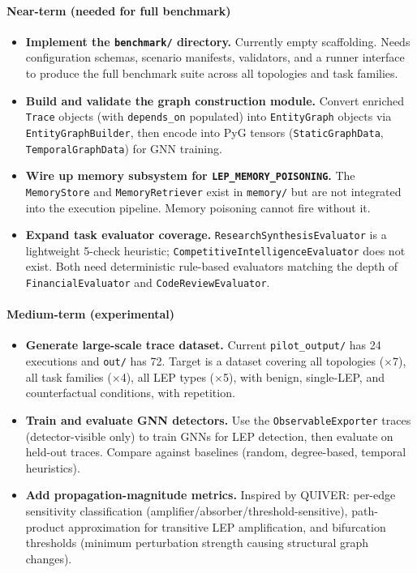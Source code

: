 \paragraph{Near-term (needed for full benchmark)}
\begin{itemize}
    \item \textbf{Implement the \texttt{benchmark/} directory.} Currently empty scaffolding. Needs configuration schemas, scenario manifests, validators, and a runner interface to produce the full benchmark suite across all topologies and task families.
    \item \textbf{Build and validate the graph construction module.} Convert enriched \texttt{Trace} objects (with \texttt{depends\_on} populated) into \texttt{EntityGraph} objects via \texttt{EntityGraphBuilder}, then encode into PyG tensors (\texttt{StaticGraphData}, \texttt{TemporalGraphData}) for GNN training.
    \item \textbf{Wire up memory subsystem for \texttt{LEP\_MEMORY\_POISONING}.} The \texttt{MemoryStore} and \texttt{MemoryRetriever} exist in \texttt{memory/} but are not integrated into the execution pipeline. Memory poisoning cannot fire without it.
    \item \textbf{Expand task evaluator coverage.} \texttt{ResearchSynthesisEvaluator} is a lightweight 5-check heuristic; \texttt{CompetitiveIntelligenceEvaluator} does not exist. Both need deterministic rule-based evaluators matching the depth of \texttt{FinancialEvaluator} and \texttt{CodeReviewEvaluator}.
\end{itemize}

\paragraph{Medium-term (experimental)}
\begin{itemize}
    \item \textbf{Generate large-scale trace dataset.} Current \texttt{pilot\_output/} has 24 executions and \texttt{out/} has 72. Target is a dataset covering all topologies ($\times$7), all task families ($\times$4), all LEP types ($\times$5), with benign, single-LEP, and counterfactual conditions, with repetition.
    \item \textbf{Train and evaluate GNN detectors.} Use the \texttt{ObservableExporter} traces (detector-visible only) to train GNNs for LEP detection, then evaluate on held-out traces. Compare against baselines (random, degree-based, temporal heuristics).
    \item \textbf{Add propagation-magnitude metrics.} Inspired by QUIVER: per-edge sensitivity classification (amplifier/absorber/threshold-sensitive), path-product approximation for transitive LEP amplification, and bifurcation thresholds (minimum perturbation strength causing structural graph changes).
\end{itemize}


